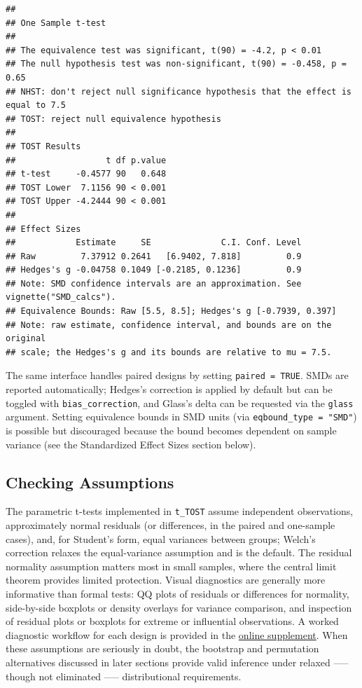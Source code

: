 \documentclass[]{interact}
\theoremstyle{plain}%
\theoremstyle{definition}
\theoremstyle{remark}
\begin{document}
\begin{verbatim}
## 
## One Sample t-test
## 
## The equivalence test was significant, t(90) = -4.2, p < 0.01
## The null hypothesis test was non-significant, t(90) = -0.458, p = 0.65
## NHST: don't reject null significance hypothesis that the effect is equal to 7.5 
## TOST: reject null equivalence hypothesis
## 
## TOST Results 
##                  t df p.value
## t-test     -0.4577 90   0.648
## TOST Lower  7.1156 90 < 0.001
## TOST Upper -4.2444 90 < 0.001
## 
## Effect Sizes 
##            Estimate     SE              C.I. Conf. Level
## Raw         7.37912 0.2641   [6.9402, 7.818]         0.9
## Hedges's g -0.04758 0.1049 [-0.2185, 0.1236]         0.9
## Note: SMD confidence intervals are an approximation. See vignette("SMD_calcs").
## Equivalence Bounds: Raw [5.5, 8.5]; Hedges's g [-0.7939, 0.397]
## Note: raw estimate, confidence interval, and bounds are on the original
## scale; the Hedges's g and its bounds are relative to mu = 7.5.
\end{verbatim}

The same interface handles paired designs by setting
\texttt{paired\ =\ TRUE}. SMDs are reported automatically; Hedges's
correction is applied by default but can be toggled with
\texttt{bias\_correction}, and Glass's delta can be requested via the
\texttt{glass} argument. Setting equivalence bounds in SMD units (via
\texttt{eqbound\_type\ =\ "SMD"}) is possible but discouraged because
the bound becomes dependent on sample variance (see the Standardized
Effect Sizes section below).

\subsection{Checking Assumptions}\label{checking-assumptions}

The parametric t-tests implemented in \texttt{t\_TOST} assume
independent observations, approximately normal residuals (or
differences, in the paired and one-sample cases), and, for Student's
form, equal variances between groups; Welch's correction relaxes the
equal-variance assumption and is the default. The residual normality
assumption matters most in small samples, where the central limit
theorem provides limited protection. Visual diagnostics are generally
more informative than formal tests: QQ plots of residuals or differences
for normality, side-by-side boxplots or density overlays for variance
comparison, and inspection of residual plots or boxplots for extreme or
influential observations. A worked diagnostic workflow for each design
is provided in the \href{https://doi.org/10.5281/zenodo.22776188}{online
supplement}. When these assumptions are seriously in doubt, the
bootstrap and permutation alternatives discussed in later sections
provide valid inference under relaxed ----- though not eliminated -----
distributional requirements.
\end{document}
